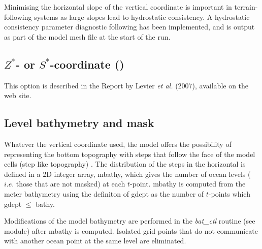\documentclass[../tex_main/NEMO_manual]{subfiles}
\begin{document}
Minimising the horizontal slope of the vertical coordinate is important in terrain-following systems as
large slopes lead to hydrostatic consistency.
A hydrostatic consistency parameter diagnostic following \citet{Haney1991} has been implemented,
and is output as part of the model mesh file at the start of the run.

\subsection{$Z^*$- or $S^*$-coordinate (\protect{}) }
\label{subsec:DOM_zgr_star}

This option is described in the Report by Levier \textit{et al.} (2007), available on the \NEMO web site. 


\subsection{Level bathymetry and mask}
\label{subsec:DOM_msk}

Whatever the vertical coordinate used,
the model offers the possibility of representing the bottom topography with steps that
follow the face of the model cells (step like topography) \citep{Madec_al_JPO96}.
The distribution of the steps in the horizontal is defined in a 2D integer array, mbathy,
which gives the number of ocean levels ($i.e.$ those that are not masked) at each $t$-point.
mbathy is computed from the meter bathymetry using the definiton of gdept as
the number of $t$-points which gdept $\leq$ bathy.

Modifications of the model bathymetry are performed in the \textit{bat\_ctl} routine (see  module) after
mbathy is computed.
Isolated grid points that do not communicate with another ocean point at the same level are eliminated.
\end{document}
